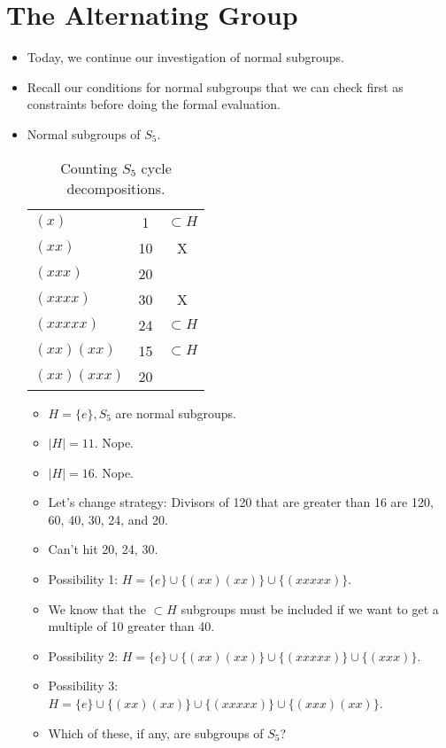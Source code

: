 \documentclass[../notes.tex]{subfiles}
\begin{document}
\section{The Alternating Group}
\begin{itemize}
    \item {}Today, we continue our investigation of normal subgroups.
    \item Recall our conditions for normal subgroups that we can check first as constraints before doing the formal evaluation.
    \item Normal subgroups of $S_5$.
    \begin{table}[H]
        \centering
        \begin{tabular}{l|c|c}
            $(x)$ & 1 & $\subset H$\\
            $(xx)$ & 10 & X\\
            $(xxx)$ & 20 & \\
            $(xxxx)$ & 30 & X\\
            $(xxxxx)$ & 24 & $\subset H$\\
            $(xx)(xx)$ & 15 & $\subset H$\\
            $(xx)(xxx)$ & 20 & \\
        \end{tabular}
        \caption{Counting $S_5$ cycle decompositions.}
        \label{tab:normalS5}
    \end{table}
    \begin{itemize}
        \item $H=\{e\},S_5$ are normal subgroups.
        \item $|H|=11$. Nope.
        \item $|H|=16$. Nope.
        \item Let's change strategy: Divisors of 120 that are greater than 16 are 120, 60, 40, 30, 24, and 20.
        \item Can't hit 20, 24, 30.
        \item Possibility 1: $H=\{e\}\cup\{(xx)(xx)\}\cup\{(xxxxx)\}$.
        \item We know that the $\subset H$ subgroups must be included if we want to get a multiple of 10 greater than 40.
        \item Possibility 2: $H=\{e\}\cup\{(xx)(xx)\}\cup\{(xxxxx)\}\cup\{(xxx)\}$.
        \item Possibility 3: $H=\{e\}\cup\{(xx)(xx)\}\cup\{(xxxxx)\}\cup\{(xxx)(xx)\}$.
        \item Which of these, if any, are subgroups of $S_5$?

\end{itemize}
\end{itemize}
\end{document}
